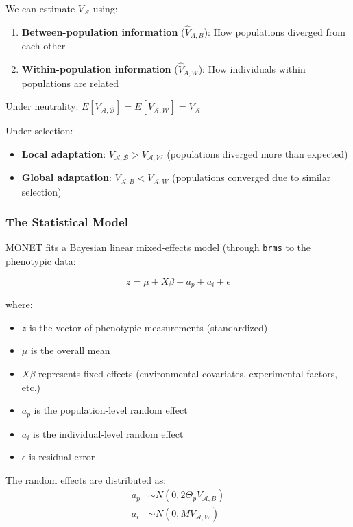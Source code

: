 \documentclass[11pt]{article}
\begin{document}
We can estimate $V_\mathcal{A}$ using:
\begin{enumerate}
\item \textbf{Between-population information} ($\hat{V}_{A,B}$): How populations diverged from each other
\item \textbf{Within-population information} ($\hat{V}_{A,W}$): How individuals within populations are related
\end{enumerate}

Under neutrality: $E[V_ \mathcal{{A},B}] = E[V_ \mathcal{{A},W}] = V_\mathcal{A}$

Under selection:
\begin{itemize}
\item \textbf{Local adaptation}: $V_ \mathcal{{A},B} > V_ \mathcal{{A},W}$ (populations diverged more than expected)
\item \textbf{Global adaptation}: $V_{ \mathcal{A},B} < V_{ \mathcal{A},W}$ (populations converged due to similar selection)
\end{itemize}

\subsubsection{The Statistical Model}

MONET fits a Bayesian linear mixed-effects model (through \texttt{brms} to the phenotypic data:

$$z = \mu + X\beta + a_p + a_i + \epsilon$$

where:
\begin{itemize}
\item $z$ is the vector of phenotypic measurements (standardized)
\item $\mu$ is the overall mean
\item $X\beta$ represents fixed effects (environmental covariates, experimental factors, etc.)
\item $a_p$ is the population-level random effect
\item $a_i$ is the individual-level random effect
\item $\epsilon$ is residual error
\end{itemize}

The random effects are distributed as:
\begin{align}
a_p &\sim N(0, 2\Theta_p V_{ \mathcal{A},B}) \\
a_i &\sim N(0, M V_{ \mathcal{A},W})
\end{align}
\end{document}
